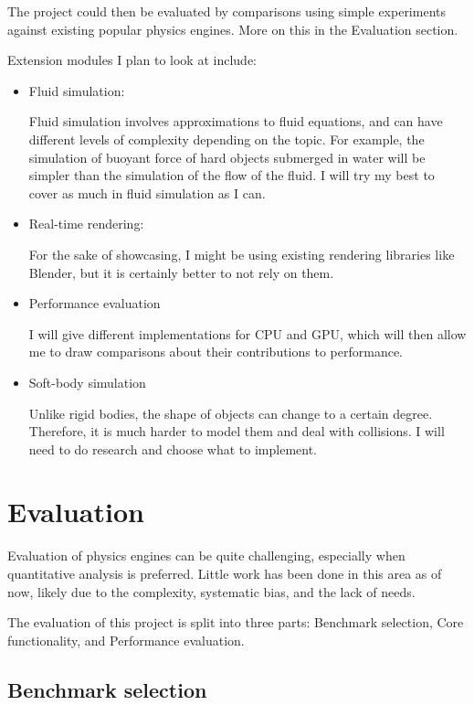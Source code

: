 \documentclass[12pt]{article}
\begin{document}
The project could then be evaluated by comparisons using simple experiments against existing popular physics engines.
More on this in the Evaluation section.

Extension modules I plan to look at include:
\begin{itemize}
\item Fluid simulation:

Fluid simulation involves approximations to fluid equations, 
and can have different levels of complexity depending on the topic.
For example, 
the simulation of buoyant force of hard objects submerged in water will be simpler than 
the simulation of the flow of the fluid.
I will try my best to cover as much in fluid simulation as I can.

\item Real-time rendering:

For the sake of showcasing, I might be using existing rendering libraries like Blender\cite{blender}, 
but it is certainly better to not rely on them.

\item Performance evaluation

I will give different implementations for CPU and GPU, 
which will then allow me to draw comparisons about their contributions to performance.

\item Soft-body simulation

Unlike rigid bodies, the shape of objects can change to a certain degree.
Therefore, it is much harder to model them and deal with collisions.
I will need to do research and choose what to implement. 

\end{itemize}

\section{Evaluation}

Evaluation of physics engines can be quite challenging, 
especially when quantitative analysis is preferred.
Little work has been done in this area as of now, 
likely due to the complexity, systematic bias, and the lack of needs.

The evaluation of this project is split into three parts: Benchmark selection, Core functionality, and Performance evaluation.

\subsection{Benchmark selection}
\end{document}

